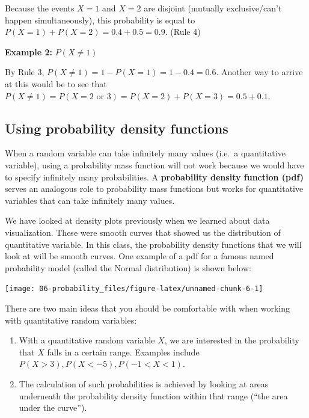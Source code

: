 \documentclass[
]{book}
\providecommand{\tightlist}{%
  \setlength{\itemsep}{0pt}\setlength{\parskip}{0pt}}
\begin{document}
Because the events \(X = 1\) and \(X = 2\) are disjoint (mutually exclusive/can't happen simultaneously), this probability is equal to \(P(X = 1) + P(X = 2) = 0.4 + 0.5 = 0.9\). (Rule 4)

\textbf{Example 2:} \(P(X \neq 1)\)

By Rule 3, \(P(X \neq 1) = 1 - P(X = 1) = 1 - 0.4 = 0.6\). Another way to arrive at this would be to see that \(P(X \neq 1) = P(X = 2 \text{ or } 3) = P(X = 2) + P(X = 3) = 0.5 + 0.1\).

\hypertarget{using-probability-density-functions}{%
\subsection{Using probability density functions}\label{using-probability-density-functions}}

When a random variable can take infinitely many values (i.e.~a quantitative variable), using a probability mass function will not work because we would have to specify infinitely many probabilities. A \textbf{probability density function (pdf)} serves an analogous role to probability mass functions but works for quantitative variables that can take infinitely many values.

We have looked at density plots previously when we learned about data visualization. These were smooth curves that showed us the distribution of quantitative variable. In this class, the probability density functions that we will look at will be smooth curves. One example of a pdf for a famous named probability model (called the Normal distribution) is shown below:

\begin{center}\texttt{[image: 06-probability\_files/figure-latex/unnamed-chunk-6-1]} \end{center}

There are two main ideas that you should be comfortable with when working with quantitative random variables:

\begin{enumerate}
\def\labelenumi{\arabic{enumi}.}
\tightlist
\item
  With a quantitative random variable \(X\), we are interested in the probability that \(X\) falls in a certain range. Examples include \(P(X > 3), P(X < -5), P(-1 < X < 1)\).
\item
  The calculation of such probabilities is achieved by looking at areas underneath the probability density function within that range (``the area under the curve'').
\end{enumerate}
\end{document}
